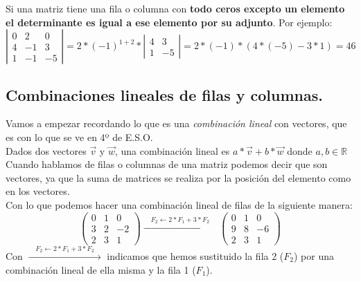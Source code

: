\documentclass[a4paper,11pt,answers]{exam}
\begin{document}
Si una matriz tiene una fila o columna con \textbf{todo ceros excepto un elemento el determinante es igual a ese elemento por su adjunto}. Por ejemplo:
\[\left|\begin{array}{rrr}
	0&2&0\\
	4&-1&3\\
	1&-1&-5
\end{array}\right| = 2 * (-1)^{1 + 2} *\left|\begin{array}{rr}
4&3\\
1&-5
\end{array}\right| = 2* (-1) * (4*(-5) - 3*1) = 46\]

\subsection{Combinaciones lineales de filas y columnas.}
Vamos a empezar recordando lo que es una \emph{combinación lineal} con vectores, que es con lo que se ve en 4º de E.S.O.\\
Dados dos vectores $\vec{v}$ y $\vec{w}$, una combinación lineal es $a*\vec{v} + b*\vec{w}$ donde $a, b \in \mathbb{R}$\\

Cuando hablamos de filas o columnas de una matriz podemos decir que son vectores, ya que la suma de matrices se realiza por la posición del elemento como en los vectores.\\

Con lo que podemos hacer una combinación lineal de filas de la siguiente manera:
\[\left(\begin{array}{rrr}
	0&1&0\\
	3&2&-2\\
	2&3&1
\end{array}\right) \xrightarrow{\quad F_2 \leftarrow 2*F_1 + 3*F_2\quad} 
\left(\begin{array}{rrr}
	0&1&0\\
	9&8&-6\\
	2&3&1
\end{array}\right)\]
Con \small{$\xrightarrow{\quad F_2 \leftarrow 2*F_1 + 3*F_2\quad}$} indicamos que hemos sustituido la fila 2 ($F_2$) por una combinación lineal de ella misma y la fila 1 ($F_1$).\\
\end{document}
